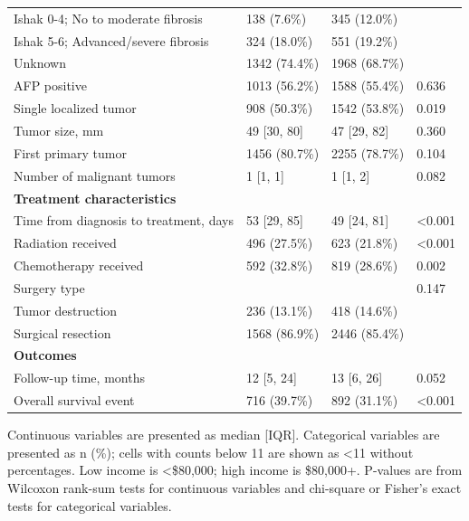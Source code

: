 \begin{table}[!htbp]
\begin{tabular}{llll}
\hspace{1em}Ishak 0-4; No to moderate fibrosis & 138 (7.6\%) & 345 (12.0\%) &  \\
\hspace{1em}Ishak 5-6; Advanced/severe fibrosis & 324 (18.0\%) & 551 (19.2\%) &  \\
\hspace{1em}Unknown & 1342 (74.4\%) & 1968 (68.7\%) &  \\
AFP positive & 1013 (56.2\%) & 1588 (55.4\%) & 0.636 \\
Single localized tumor & 908 (50.3\%) & 1542 (53.8\%) & 0.019 \\
Tumor size, mm & 49 [30, 80] & 47 [29, 82] & 0.360 \\
First primary tumor & 1456 (80.7\%) & 2255 (78.7\%) & 0.104 \\
Number of malignant tumors & 1 [1, 1] & 1 [1, 2] & 0.082 \\
\midrule
\multicolumn{4}{l}{\textbf{Treatment characteristics}} \\
Time from diagnosis to treatment, days & 53 [29, 85] & 49 [24, 81] & \textless{}0.001 \\
Radiation received & 496 (27.5\%) & 623 (21.8\%) & \textless{}0.001 \\
Chemotherapy received & 592 (32.8\%) & 819 (28.6\%) & 0.002 \\
Surgery type &  &  & 0.147 \\
\hspace{1em}Tumor destruction & 236 (13.1\%) & 418 (14.6\%) &  \\
\hspace{1em}Surgical resection & 1568 (86.9\%) & 2446 (85.4\%) &  \\
\midrule
\multicolumn{4}{l}{\textbf{Outcomes}} \\
Follow-up time, months & 12 [5, 24] & 13 [6, 26] & 0.052 \\
Overall survival event & 716 (39.7\%) & 892 (31.1\%) & \textless{}0.001 \\
\bottomrule
\end{tabular}
\begin{minipage}{0.95\linewidth}
\vspace{0.5em}
\footnotesize Continuous variables are presented as median [IQR]. Categorical variables are presented as n (\%); cells with counts below 11 are shown as <11 without percentages. Low income is <\$80,000; high income is \$80,000+. P-values are from Wilcoxon rank-sum tests for continuous variables and chi-square or Fisher's exact tests for categorical variables.
\end{minipage}
\end{table}
